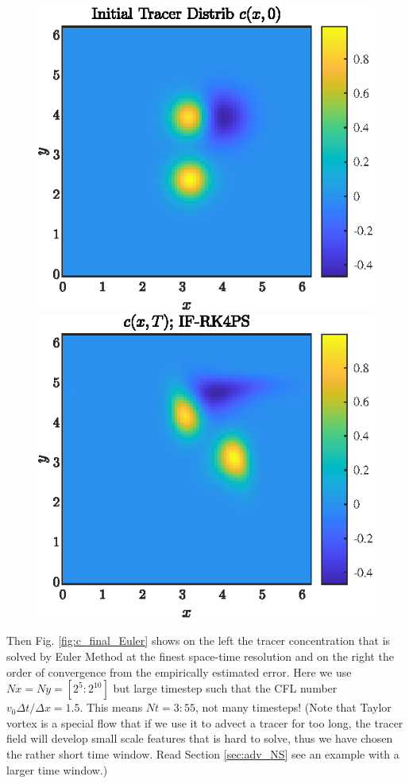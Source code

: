 \documentclass[11pt,letterpaper]{article}
\begin{document}
\begin{figure}[H]
    \centering
    \includegraphics{figs/c_init_IF-RK4PS}
    \includegraphics{figs/c_final_IF-RK4PS}
    \caption{}\label{fig:c_init_IF}
\end{figure}
Then Fig. \ref{fig:c_final_Euler} shows on the left the tracer concentration that is solved by Euler Method at the finest space-time resolution and on the right the order of convergence from the empirically estimated error. Here we use $Nx = Ny= [2^5:2^{10}]$ but large timestep such that the CFL number $v_0\Delta t/\Delta x = 1.5$. This means $Nt = 3:55$, not many timesteps! (Note that Taylor vortex is a special flow that if we use it to advect a tracer for too long, the tracer field will develop small scale features that is hard to solve, thus we have chosen the rather short time window. Read Section \ref{sec:adv_NS} see an example with a larger time window.)
\end{document}
